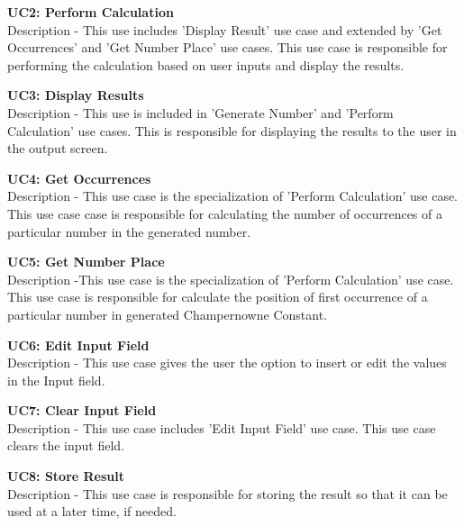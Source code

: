 \documentclass[paper=a4, fontsize=11pt]{report}
\numberwithin{equation}{section}		%
\numberwithin{figure}{section}			%
\numberwithin{table}{section}				%
\begin{document}
\begin{flushleft}
\textbf{UC2: Perform Calculation }
\\Description - This use includes 'Display Result' use case and extended by 'Get Occurrences' and 'Get Number Place' use cases. This use case is responsible for performing the calculation based on user inputs and display the results.
\end{flushleft}

\begin{flushleft}
\textbf{UC3: Display Results }
\\Description - This use is included in 'Generate Number' and 'Perform Calculation' use cases. This is responsible for displaying the results to the user in the output screen.
\end{flushleft}

\begin{flushleft}
\textbf{UC4: Get Occurrences}
\\Description - This use case is the specialization of 'Perform Calculation' use case. This use case case is responsible for calculating the number of occurrences of a particular number in the generated number.
\end{flushleft}

\begin{flushleft}
\textbf{UC5: Get Number Place }
\\Description -This use case is the specialization of 'Perform Calculation' use case. This use case is responsible for calculate the position of first occurrence of a particular number in generated Champernowne Constant.
\end{flushleft}

\begin{flushleft}
\textbf{UC6: Edit Input Field }
\\Description - This use case gives the user the option to insert or edit the values in the Input field.
\end{flushleft}

\begin{flushleft}
\textbf{UC7: Clear Input Field  }
\\Description - This use case includes 'Edit Input Field' use case. This use case clears the input field.
\end{flushleft}

\begin{flushleft}
\textbf{UC8: Store Result }
\\Description - This use case is responsible for storing the result so that it can be used at a later time, if needed.
\end{flushleft}
\end{document}
